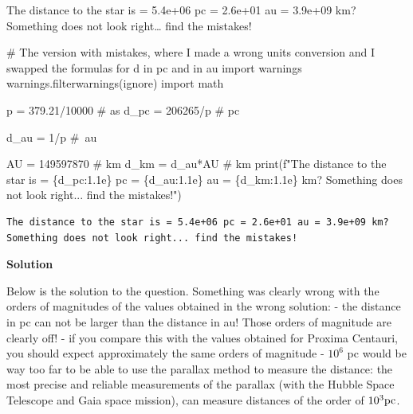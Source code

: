 \documentclass[
  letterpaper,
  DIV=11,
  numbers=noendperiod]{scrreprt}
\newenvironment{Shaded}{\begin{snugshade}}{\end{snugshade}}
\newcommand{\BuiltInTok}[1]{\textcolor[rgb]{0.00,0.23,0.31}{#1}}
\newcommand{\CommentTok}[1]{\textcolor[rgb]{0.37,0.37,0.37}{#1}}
\newcommand{\DecValTok}[1]{\textcolor[rgb]{0.68,0.00,0.00}{#1}}
\newcommand{\FloatTok}[1]{\textcolor[rgb]{0.68,0.00,0.00}{#1}}
\newcommand{\ImportTok}[1]{\textcolor[rgb]{0.00,0.46,0.62}{#1}}
\newcommand{\NormalTok}[1]{\textcolor[rgb]{0.00,0.23,0.31}{#1}}
\newcommand{\OperatorTok}[1]{\textcolor[rgb]{0.37,0.37,0.37}{#1}}
\newcommand{\SpecialCharTok}[1]{\textcolor[rgb]{0.37,0.37,0.37}{#1}}
\newcommand{\SpecialStringTok}[1]{\textcolor[rgb]{0.13,0.47,0.30}{#1}}
\newcommand{\StringTok}[1]{\textcolor[rgb]{0.13,0.47,0.30}{#1}}
\begin{document}
The distance to the star is = 5.4e+06 pc = 2.6e+01 au = 3.9e+09 km?
Something does not look right\ldots{} find the mistakes!

\begin{Shaded}
\begin{Highlighting}[]
\CommentTok{\# The version with mistakes, where I made a wrong units conversion and I swapped the formulas for d in pc and in au}
\ImportTok{import}\NormalTok{ warnings}
\NormalTok{warnings.filterwarnings(}\StringTok{\textquotesingle{}ignore\textquotesingle{}}\NormalTok{)}
\ImportTok{import}\NormalTok{ math}

\NormalTok{p }\OperatorTok{=} \FloatTok{379.21}\OperatorTok{/}\DecValTok{10000} \CommentTok{\# as }
\NormalTok{d\_pc }\OperatorTok{=} \DecValTok{206265}\OperatorTok{/}\NormalTok{p }\CommentTok{\# pc}

\NormalTok{d\_au }\OperatorTok{=} \DecValTok{1}\OperatorTok{/}\NormalTok{p }\CommentTok{\# au}

\NormalTok{AU }\OperatorTok{=} \DecValTok{149597870} \CommentTok{\# km}
\NormalTok{d\_km }\OperatorTok{=}\NormalTok{ d\_au}\OperatorTok{*}\NormalTok{AU }\CommentTok{\# km}
\BuiltInTok{print}\NormalTok{(}\SpecialStringTok{f"The distance to the star is = }\SpecialCharTok{\{}\NormalTok{d\_pc}\SpecialCharTok{:1.1e\}}\SpecialStringTok{ pc = }\SpecialCharTok{\{}\NormalTok{d\_au}\SpecialCharTok{:1.1e\}}\SpecialStringTok{ au = }\SpecialCharTok{\{}\NormalTok{d\_km}\SpecialCharTok{:1.1e\}}\SpecialStringTok{ km? Something does not look right... find the mistakes!"}\NormalTok{)}
\end{Highlighting}
\end{Shaded}

\begin{verbatim}
The distance to the star is = 5.4e+06 pc = 2.6e+01 au = 3.9e+09 km? Something does not look right... find the mistakes!
\end{verbatim}

\textbf{Solution}

Below is the solution to the question. Something was clearly wrong with
the orders of magnitudes of the values obtained in the wrong solution: -
the distance in pc can not be larger than the distance in au! Those
orders of magnitude are clearly off! - if you compare this with the
values obtained for Proxima Centauri, you should expect approximately
the same orders of magnitude - \(10^6\) pc would be way too far to be
able to use the parallax method to measure the distance: the most
precise and reliable measurements of the parallax (with the Hubble Space
Telescope and Gaia space mission), can measure distances of the order of
\(10^3\rm{pc}\).
\end{document}
